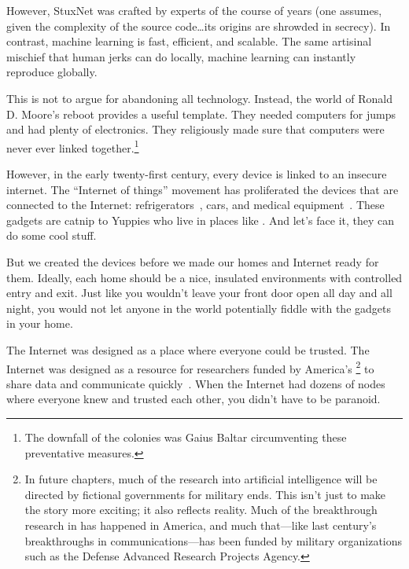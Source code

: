 However, StuxNet was crafted by experts of the course of years (one
assumes, given the complexity of the source code\dots its origins are
shrowded in secrecy).
%
In contrast, machine learning is fast, efficient, and scalable.
%
The same artisinal
mischief that human jerks can do locally, machine learning can
instantly reproduce globally.  

This is not to argue for abandoning all technology.
%
Instead, the world of Ronald D. Moore's 
reboot provides a useful template.
%
They needed computers for jumps and had plenty of electronics.
%
They religiously made sure that computers were never ever linked
together.\footnote{The downfall of the colonies was Gaius Baltar
  circumventing these preventative measures.}


However, in the early twenty-first century, every device is linked to
an insecure internet.
%
The ``Internet of things'' movement has proliferated the devices that
are connected to the Internet: refrigerators~\citep{tanczer-18}, cars,
and medical equipment~\citep{yaqoob-19}.
%
These gadgets are catnip to Yuppies who live in places like
\crunchyCity{}.  And let's face it, they can do some cool stuff.

But we created the devices before we made our homes and Internet ready
for them.
%
Ideally, each home should be a nice, insulated environments
with controlled entry and exit.
%
Just like you wouldn't leave your
front door open all day and all night, you would not let anyone in the
world potentially fiddle with the gadgets in your home.  

The Internet was designed as a place where everyone could be trusted.
The Internet was designed as a resource for researchers funded by
America's \footnote{In future chapters, much of the
  research into artificial intelligence will be directed by fictional
  governments for military ends.  This isn't just to make the story
  more exciting; it also reflects reality.  Much of the breakthrough
  research in  has happened in America, and much that---like
  last century's breakthroughs in communications---has been funded by
  military organizations such as the Defense Advanced Research
  Projects Agency.} to share data and communicate
quickly~\citep{leiner-09}.
%
When the Internet had dozens of nodes where everyone knew and trusted
each other, you didn't have to be paranoid.

